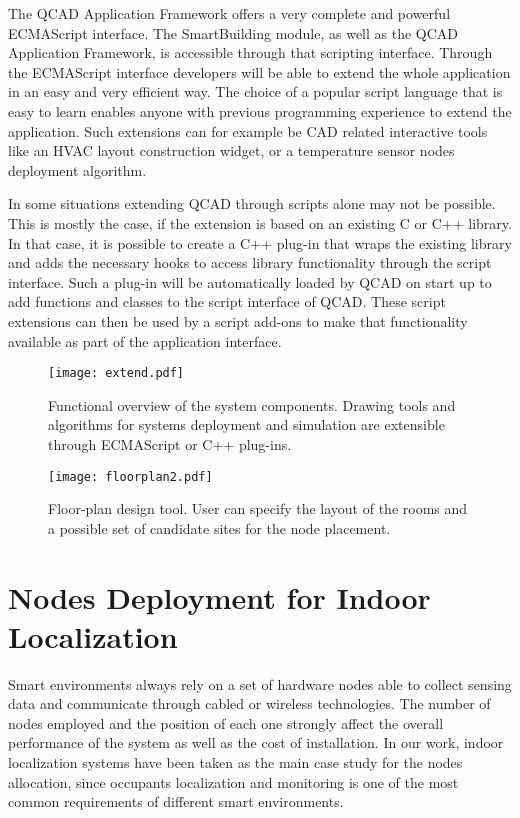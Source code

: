 The QCAD Application Framework offers a very complete and powerful ECMAScript interface. The SmartBuilding module, as well as the QCAD Application Framework, is accessible through that scripting interface. Through the ECMAScript interface developers will be able to extend the whole application in an easy and very efficient way. The choice of a popular script language that is easy to learn enables anyone with previous programming experience to extend the application. Such extensions can for example be CAD related interactive tools like an HVAC layout construction widget, or a temperature sensor nodes deployment algorithm.

In some situations extending QCAD through scripts alone may not be possible. This is mostly the case, if the extension is based on an existing C or C++ library. In that case, it is possible to create a C++ plug-in that wraps the existing library and adds the necessary hooks to access library functionality through the script interface. Such a plug-in will be automatically loaded by QCAD on start up to add functions and classes to the script interface of QCAD. These script extensions can then be used by a script add-ons to make that functionality available as part of the application interface.


\begin{figure}[h!tb]
\centering\texttt{[image: extend.pdf]}
\caption[Functional overview of the system components of the CAD application.]{Functional overview of the system components. Drawing tools and algorithms for systems deployment and simulation are extensible through ECMAScript or C++ plug-ins.}
\end{figure}

\begin{figure}
\centering\texttt{[image: floorplan2.pdf]}
\caption[Graphical interface of the floor-plan design of the CAD tool.]{Floor-plan design tool. User can specify the layout of the rooms and a possible set of candidate sites for the node placement.}
\label{fig:floor}
\end{figure}

\section{Nodes Deployment for Indoor Localization}\label{sec:problem}
Smart environments always rely on a set of hardware nodes able to collect sensing data and communicate through cabled or wireless technologies. The number of nodes employed and the position of each one strongly affect the overall performance of the system as well as the cost of installation.
In our work, indoor localization systems have been taken as the main case study for the nodes allocation, since occupants localization and monitoring is one of the most common requirements of different smart environments.

